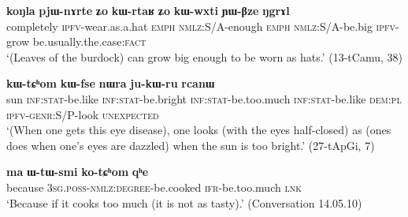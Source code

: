 \documentclass[oneside,a4paper,11pt]{article}
\newcommand{\ipa}[1]{\textbf{\phon#1}} %
\newcommand{\jpg}[2]{\ipa{#1} `#2'} %
\begin{document}
\begin{exe}
\ex \label{ex:pjWnArte}
\gll \ipa{koŋla} 	\ipa{pjɯ-nɤrte} 	\ipa{ʑo} 	\ipa{kɯ-rtaʁ} 	\ipa{ʑo} 	\ipa{kɯ-wxti} 	\ipa{ɲɯ-βze} 	\ipa{ŋgrɤl}  \\
completely \textsc{ipfv}-wear.as.a.hat \textsc{emph} \textsc{nmlz}:S/A-enough \textsc{emph} \textsc{nmlz}:S/A-be.big \textsc{ipfv}-grow be.usually.the.case:\textsc{fact} \\
\glt `(Leaves of the burdock) can grow big enough to be worn as hats.' (13-tCamu, 38)
\end{exe}
 
\begin{exe}
\ex \label{ex:kWfsoR.kWtChom}
\gll [\ipa{tɤŋe} 	\ipa{kɯ-fse} 	\ipa{kɯ-fsoʁ}] 	\ipa{kɯ-tɕʰom} 	\ipa{kɯ-fse} 	\ipa{nɯra} 	\ipa{ju-kɯ-ru} 	\ipa{rcanɯ} \\
sun \textsc{inf:stat}-be.like \textsc{inf:stat}-be.bright \textsc{inf:stat}-be.too.much \textsc{inf:stat}-be.like \textsc{dem:pl} \textsc{ipfv-genr}:S/P-look \textsc{unexpected} \\
\glt `(When one gets this eye disease), one looks (with the eyes half-closed) as (ones does when one's eyes are dazzled) when the sun is too bright.' (27-tApGi, 7)
\end{exe}

\begin{exe}
\ex \label{ex:kotChom}
\gll
\ipa{ma} 	\ipa{ɯ-tɯ-smi} 	\ipa{ko-tɕʰom} 	\ipa{qʰe} \\
because \textsc{3sg.poss-nmlz:degree}-be.cooked \textsc{ifr}-be.too.much \textsc{lnk} \\
\glt `Because if it cooks too much (it is not as tasty).' (Conversation 14.05.10)
\end{exe}

 
% 
%
\end{document}
